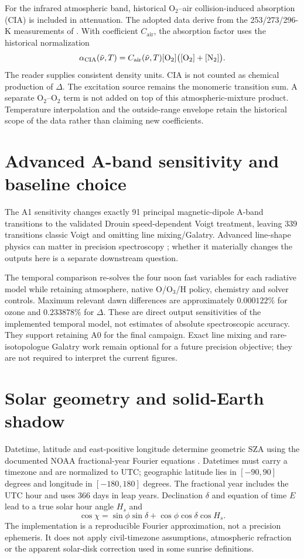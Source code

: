 For the infrared atmospheric band, historical O$_2$--air collision-induced absorption (CIA) is included in attenuation. The adopted data derive from the 253/273/296-K measurements of \citet{mate1999}. With coefficient $C_{\mathrm{air}}$, the absorption factor uses the historical normalization
\begin{equation}\alpha_{\mathrm{CIA}}(\tilde\nu,T)=C_{\mathrm{air}}(\tilde\nu,T)
[\mathrm{O}_2]\bigl([\mathrm{O}_2]+[\mathrm{N_2}]\bigr).\label{eq:CIA}\end{equation}
The reader supplies consistent density units. CIA is not counted as chemical production of $\Delta$. The excitation source remains the monomeric transition sum. A separate O$_2$--O$_2$ term is not added on top of this atmospheric-mixture product. Temperature interpolation and the outside-range envelope retain the historical scope of the data rather than claiming new coefficients.

\section{Advanced A-band sensitivity and baseline choice}
The A1 sensitivity changes exactly 91 principal magnetic-dipole A-band transitions to the validated Drouin speed-dependent Voigt treatment, leaving 339 transitions classic Voigt and omitting line mixing/Galatry. Advanced line-shape physics can matter in precision spectroscopy \citep{drouin2017}; whether it materially changes the outputs here is a separate downstream question.

The temporal comparison re-solves the four noon fast variables for each radiative model while retaining atmosphere, native O/O$_3$/H policy, chemistry and solver controls. Maximum relevant dawn differences are approximately $0.000122\%$ for ozone and $0.233878\%$ for $\Delta$. These are direct output sensitivities of the implemented temporal model, not estimates of absolute spectroscopic accuracy. They support retaining A0 for the final campaign. Exact line mixing and rare-isotopologue Galatry work remain optional for a future precision objective; they are not required to interpret the current figures.

\section{Solar geometry and solid-Earth shadow}
Datetime, latitude and east-positive longitude determine geometric SZA using the documented NOAA fractional-year Fourier equations \citep{noaa}. Datetimes must carry a timezone and are normalized to UTC; geographic latitude lies in $[-90,90]$ degrees and longitude in $[-180,180]$ degrees. The fractional year includes the UTC hour and uses 366 days in leap years. Declination $\delta$ and equation of time $E$ lead to a true solar hour angle $H_s$ and
\begin{equation}\cos\chi=\sin\phi\sin\delta+\cos\phi\cos\delta\cos H_s.\label{eq:SZA}\end{equation}
The implementation is a reproducible Fourier approximation, not a precision ephemeris. It does not apply civil-timezone assumptions, atmospheric refraction or the apparent solar-disk correction used in some sunrise definitions.

